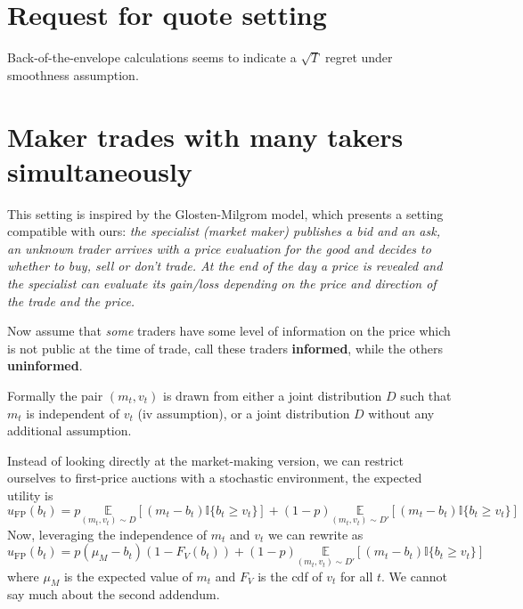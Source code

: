 \documentclass[a4paper,11pt]{article}
\begin{document}
\section{Request for quote setting}
Back-of-the-envelope calculations seems to indicate a $\sqrt{T}$ regret under smoothness assumption.

\section{Maker trades with many takers simultaneously}




This setting is inspired by the Glosten-Milgrom model, which presents a setting compatible with ours: \textit{the specialist (market maker) publishes a bid and an ask, an unknown trader arrives with a price evaluation for the good and decides to whether to buy, sell or don't trade. At the end of the day a price is revealed and the specialist can evaluate its gain/loss depending on the price and direction of the trade and the price.}

Now assume that \textit{some} traders have some level of information on the price which is not public at the time of trade, call these traders \textbf{informed}, while the others \textbf{uninformed}.

Formally the pair $(m_t, v_t)$ is drawn from either a joint distribution $D$ such that $m_t$ is independent of $v_t$ (iv assumption), or a joint distribution $D$ without any additional assumption.

Instead of looking directly at the market-making version, we can restrict ourselves to first-price auctions with a stochastic environment, the expected utility is
\[
    u_\text{FP}(b_t)
=
	p \underset{(m_t, v_t) \sim D}{\mathbb{E}}[(m_t - b_t)\mathbb{I}\{b_t \ge v_t\}]
	+ (1-p) \underset{(m_t, v_t) \sim D'}{\mathbb{E}}[(m_t - b_t)\mathbb{I}\{b_t \ge v_t\}]
\]
Now, leveraging the independence of $m_t$ and $v_t$ we can rewrite as
\[
    u_\text{FP}(b_t)
=
	p (\mu_M - b_t)(1 - F_V(b_t))
	+ (1-p) \underset{(m_t, v_t) \sim D'}{\mathbb{E}}[(m_t - b_t)\mathbb{I}\{b_t \ge v_t\}]
\]
where $\mu_M$ is the expected value of $m_t$ and $F_V$ is the cdf of $v_t$ for all $t$. We cannot say much about the second addendum.
\end{document}
